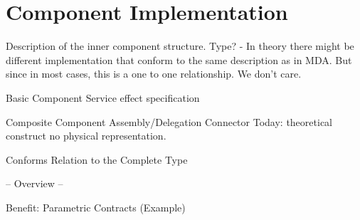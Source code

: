 \section{Component Implementation}
Description of the inner component structure. Type? -  In theory there might be different implementation that conform to the same description as in MDA. But since in most cases, this is a one to one relationship. We don't care.

Basic Component
Service effect specification

Composite Component
Assembly/Delegation Connector 
Today: theoretical construct no physical representation.

Conforms Relation to the Complete Type

-- Overview --

Benefit: Parametric Contracts (Example)
